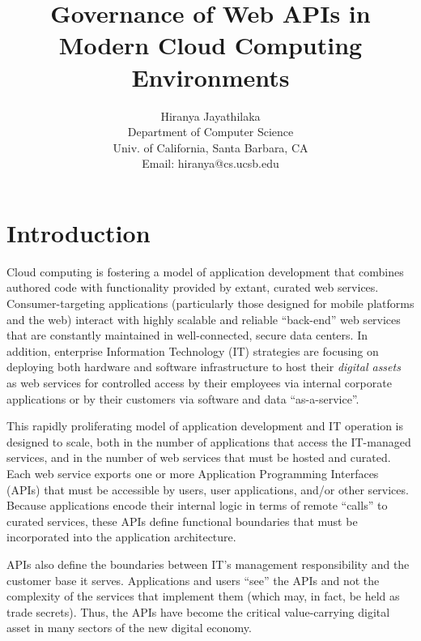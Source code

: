 \documentclass[10pt]{article}
\begin{document}
\date{}

\title{Governance of Web APIs in Modern Cloud Computing Environments}

\author{Hiranya Jayathilaka\\
Department of Computer Science\\
Univ. of California, Santa Barbara, CA\\
Email: hiranya@cs.ucsb.edu
}
\maketitle

\section{Introduction}
Cloud computing is fostering a model of 
application development that combines authored code with functionality
provided by extant, curated web services.  Consumer-targeting applications 
(particularly those designed for mobile platforms and the web) interact with highly
scalable and reliable ``back-end'' web services that are constantly
maintained in well-connected, secure data centers.  In addition, enterprise
Information Technology (IT) strategies are focusing on deploying both hardware
and software infrastructure to host their {\em digital assets} as
web services for controlled
access by their employees via internal corporate applications or
by their customers via software and data ``as-a-service''.

This rapidly proliferating model of application development and IT operation
is designed to scale, both in the number of applications that access the
IT-managed services, and in the number of web services that must be
hosted and curated.  Each web service exports one or more Application Programming
Interfaces (APIs) that must be accessible by users, user applications, and/or
other services.
Because applications encode their internal logic in terms of
remote ``calls'' to curated services,
these APIs define functional boundaries that must be incorporated into the
application architecture.  

APIs also define the boundaries between IT's management responsibility and the
customer base it serves.  
Applications and users ``see'' the APIs and not the
complexity of the services that implement them (which may, in fact, be held as
trade secrets).  Thus, the APIs have become the critical value-carrying 
digital asset in many sectors of the new digital economy.
\end{document}

